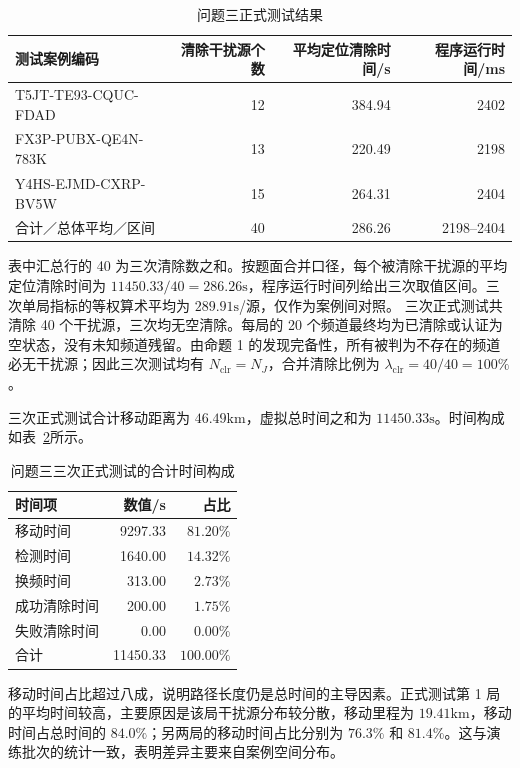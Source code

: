 \begin{table}[htbp]
\centering
\caption{问题三正式测试结果}
\label{tab:q3_formal}
\begin{tabular}{lrrr}
\toprule
测试案例编码 & 清除干扰源个数 & 平均定位清除时间/s & 程序运行时间/ms \\
\midrule
T5JT-TE93-CQUC-FDAD & 12 & 384.94 & 2402 \\
FX3P-PUBX-QE4N-783K & 13 & 220.49 & 2198 \\
Y4HS-EJMD-CXRP-BV5W & 15 & 264.31 & 2404 \\
\midrule
合计／总体平均／区间 & 40 & 286.26 & 2198--2404 \\
\bottomrule
\end{tabular}
\end{table}

表中汇总行的 40 为三次清除数之和。按题面合并口径，每个被清除干扰源的平均定位清除时间为 $11450.33/40=286.26\mathrm{s}$，程序运行时间列给出三次取值区间。三次单局指标的等权算术平均为 $289.91\mathrm{s}$/源，仅作为案例间对照。
三次正式测试共清除 40 个干扰源，三次均无空清除。每局的 20 个频道最终均为已清除或认证为空状态，没有未知频道残留。由命题 1 的发现完备性，所有被判为不存在的频道必无干扰源；因此三次测试均有 $N_{\mathrm{clr}}=N_J$，合并清除比例为 $\lambda_{\mathrm{clr}}=40/40=100\%$。

三次正式测试合计移动距离为 $46.49\mathrm{km}$，虚拟总时间之和为 $11450.33\mathrm{s}$。时间构成如表~\ref{tab:q3_time}所示。

\begin{table}[htbp]
\centering
\caption{问题三三次正式测试的合计时间构成}
\label{tab:q3_time}
\begin{tabular}{lrr}
\toprule
时间项 & 数值/s & 占比 \\
\midrule
移动时间 & 9297.33 & $81.20\%$ \\
检测时间 & 1640.00 & $14.32\%$ \\
换频时间 & 313.00 & $2.73\%$ \\
成功清除时间 & 200.00 & $1.75\%$ \\
失败清除时间 & 0.00 & $0.00\%$ \\
\midrule
合计 & 11450.33 & $100.00\%$ \\
\bottomrule
\end{tabular}
\end{table}

移动时间占比超过八成，说明路径长度仍是总时间的主导因素。正式测试第 1 局的平均时间较高，主要原因是该局干扰源分布较分散，移动里程为 $19.41\mathrm{km}$，移动时间占总时间的 $84.0\%$；另两局的移动时间占比分别为 $76.3\%$ 和 $81.4\%$。这与演练批次的统计一致，表明差异主要来自案例空间分布。

